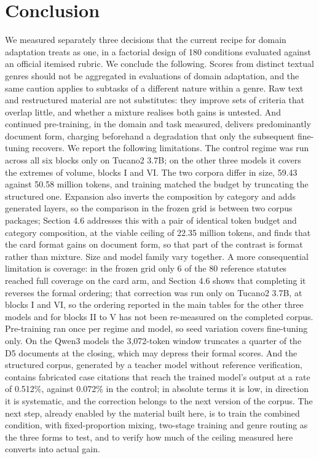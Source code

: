 \documentclass{IOS-Book-Article}
\begin{document}
\section{Conclusion}
We measured separately three decisions that the current recipe for domain adaptation treats as one, in a factorial design of 180 conditions evaluated against an official itemised rubric. We conclude the following. Scores from distinct textual genres should not be aggregated in evaluations of domain adaptation, and the same caution applies to subtasks of a different nature within a genre. Raw text and restructured material are not substitutes: they improve sets of criteria that overlap little, and whether a mixture realises both gains is untested. And continued pre-training, in the domain and task measured, delivers predominantly document form, charging beforehand a degradation that only the subsequent fine-tuning recovers. We report the following limitations. The control regime was run across all six blocks only on Tucano2 3.7B; on the other three models it covers the extremes of volume, blocks I and VI. The two corpora differ in size, 59.43 against 50.58 million tokens, and training matched the budget by truncating the structured one. Expansion also inverts the composition by category and adds generated layers, so the comparison in the frozen grid is between two corpus packages; Section 4.6 addresses this with a pair of identical token budget and category composition, at the viable ceiling of 22.35 million tokens, and finds that the card format gains on document form, so that part of the contrast is format rather than mixture. Size and model family vary together. A more consequential limitation is coverage: in the frozen grid only 6 of the 80 reference statutes reached full coverage on the card arm, and Section 4.6 shows that completing it reverses the formal ordering; that correction was run only on Tucano2 3.7B, at blocks I and VI, so the ordering reported in the main tables for the other three models and for blocks II to V has not been re-measured on the completed corpus. Pre-training ran once per regime and model, so seed variation covers fine-tuning only. On the Qwen3 models the 3,072-token window truncates a quarter of the D5 documents at the closing, which may depress their formal scores. And the structured corpus, generated by a teacher model without reference verification, contains fabricated case citations that reach the trained model's output at a rate of 0.512\%, against 0.072\% in the control; in absolute terms it is low, in direction it is systematic, and the correction belongs to the next version of the corpus. The next step, already enabled by the material built here, is to train the combined condition, with fixed-proportion mixing, two-stage training and genre routing as the three forms to test, and to verify how much of the ceiling measured here converts into actual gain.
\appendix
\end{document}
